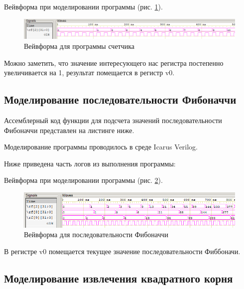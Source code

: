 \documentclass[a4paper,14pt]{article}
\begin{document}
	{\small {}}
	
	Вейвформа при моделировании программы (рис. \ref{fig:00wvf}).
	
	\begin{figure}[H]
		\centering
		\includegraphics[width=0.95\linewidth]{images/00_wvf}
		\caption{Вейвформа для программы счетчика}
		\label{fig:00wvf}
	\end{figure}

	Можно заметить, что значение интересующего нас регистра постепенно увеличивается на 1, результат помещается в регистр v0.
	
	
	\subsection{Моделирование последовательности Фибоначчи}
	
	Ассемблерный код функции для подсчета значений последовательности Фибоначчи представлен на листинге ниже.
	
	{\small {}}
	
	Моделирование программы проводилось в среде Icarus Verilog.
	
	Ниже приведена часть логов из выполнения программы:
	
	{\small {}}
	
	Вейвформа при моделировании программы (рис. \ref{fig:01wvf}).
	
	\begin{figure}[H]
		\centering
		\includegraphics[width=0.95\linewidth]{images/01_wvf}
		\caption{Вейвформа для последовательности Фибоначчи}
		\label{fig:01wvf}
	\end{figure}

	В регистре v0 помещается текущее значение последовательности Фиббоначи.
	

	\subsection{Моделирование извлечения квадратного корня}
	
\end{document}
